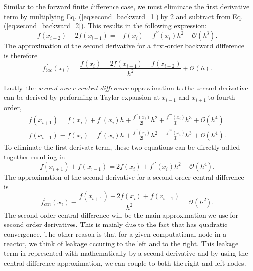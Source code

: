 Similar to the forward finite difference case, we must eliminate the first derivative term by multiplying 
Eq. (\ref{eq:second_backward_1}) by 2 and subtract from Eq. (\ref{eq:second_backward_2}). This results in the following expression:
\begin{equation}
    f\left(x_{i-2}\right) - 2f\left(x_{i-1}\right) = -f\left(x_{i}\right) + f^{\prime\prime}\left(x_{i}\right)h^{2} - \mathcal{O}\left(h^{3}\right).
\end{equation}
The approximation of the second derivative for a first-order backward difference is therefore
\begin{equation}
    \boxed{f^{\prime\prime}_{bac}\left(x_{i}\right) = \frac{f\left(x_{i}\right) - 2f\left(x_{i-1}\right) + f\left(x_{i-2}\right)}{h^{2}} + \mathcal{O}\left(h\right).}
    \label{eq:second_backward}
\end{equation}
\par 
Lastly, the \emph{second-order central difference} approximation to the second derivative can be derived by performing 
a Taylor expansion at $x_{i-1}$ and $x_{i+1}$ to fourth-order,
\begin{eqnarray}
    f\left(x_{i+1}\right) = f\left(x_{i}\right) + f^{\prime}\left(x_{i}\right)h + \frac{f^{\prime\prime}\left(x_{i}\right)}{2!}h^{2} + \frac{f^{\prime\prime\prime}\left(x_{i}\right)}{3!}h^{3} + \mathcal{O}\left(h^{4}\right) \\
    f\left(x_{i-1}\right) = f\left(x_{i}\right) - f^{\prime}\left(x_{i}\right)h + \frac{f^{\prime\prime}\left(x_{i}\right)}{2!}h^{2} - \frac{f^{\prime\prime\prime}\left(x_{i}\right)}{3!}h^{3} + \mathcal{O}\left(h^{4}\right).
\end{eqnarray}
To eliminate the first derivate term, these two equations can be directly added together resulting in
\begin{equation}
    f\left(x_{i+1}\right) + f\left(x_{i-1}\right) = 2f\left(x_{i}\right) + f^{\prime\prime}\left(x_{i}\right)h^{2} + \mathcal{O}\left(h^{4}\right).
\end{equation}
The approximation of the second derivative for a second-order central difference is
\begin{equation}
    \boxed{f^{\prime\prime}_{cen}\left(x_{i}\right) = \frac{f\left(x_{i+1}\right) -2f\left(x_{i}\right) + f\left(x_{i-1}\right)}{h^{2}} - \mathcal{O}\left(h^{2}\right).}
     \label{eq:second_central}
\end{equation}
The second-order central difference will be the main approximation we use for second order derivatives. This is mainly due to the
fact that has quadratic convergence. The other reason is that for a given computational node in a reactor, we think of leakage
occuring to the left and to the right. This leakage term in represented with mathematically by a second derivative and by using
the central difference approximation, we can couple to both the right and left nodes.

